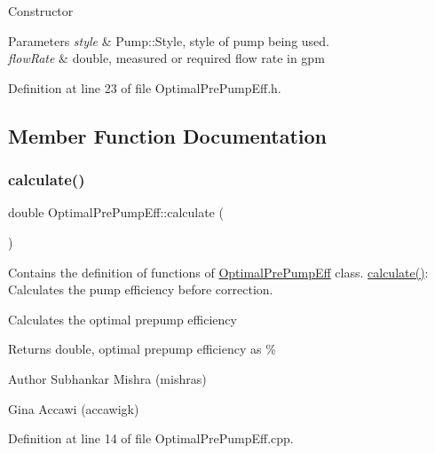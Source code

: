 Constructor 
\begin{DoxyParams}{Parameters}
{\em style} & Pump\+::\+Style, style of pump being used. \\
\hline
{\em flow\+Rate} & double, measured or required flow rate in gpm \\
\hline
\end{DoxyParams}


Definition at line 23 of file Optimal\+Pre\+Pump\+Eff.\+h.



\subsection{Member Function Documentation}
\mbox{\label{class_optimal_pre_pump_eff_a7ced63984a89975c4f8f54642701d841}} 
\subsubsection{\texorpdfstring{calculate()}{calculate()}\hspace{0.1cm}{\footnotesize\ttfamily [1/3]}}
{\footnotesize\ttfamily double Optimal\+Pre\+Pump\+Eff\+::calculate (\begin{DoxyParamCaption}{ }\end{DoxyParamCaption})}



Contains the definition of functions of \hyperlink{class_optimal_pre_pump_eff}{Optimal\+Pre\+Pump\+Eff} class. \hyperlink{class_optimal_pre_pump_eff_a7ced63984a89975c4f8f54642701d841}{calculate()}\+: Calculates the pump efficiency before correction. 

Calculates the optimal prepump efficiency \begin{DoxyReturn}{Returns}
double, optimal prepump efficiency as \%
\end{DoxyReturn}
\begin{DoxyAuthor}{Author}
Subhankar Mishra (mishras) 

Gina Accawi (accawigk) 
\end{DoxyAuthor}


Definition at line 14 of file Optimal\+Pre\+Pump\+Eff.\+cpp.

\mbox{\label{class_optimal_pre_pump_eff_a7ced63984a89975c4f8f54642701d841}} 
